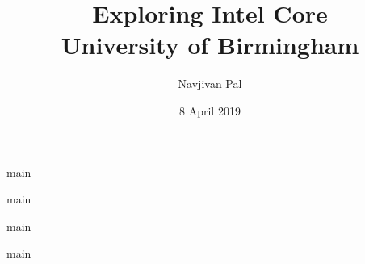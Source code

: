 



\title{
    {Exploring Intel Core}\\
    {\large University of Birmingham}
}
\author{Navjivan Pal}
\date{8 April 2019}

\maketitle



\tableofcontents
\newpage

{main}

{main}

{main}

{main}

\printbibliography


